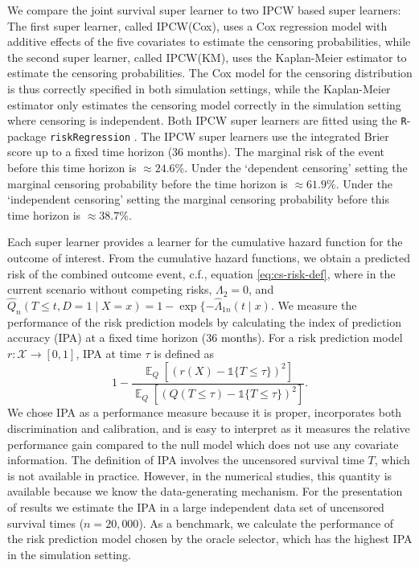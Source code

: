 \documentclass[alpha-refs]{wiley-article}
\DeclareMathOperator{\E}{\mathbb{E}} %
\newcommand{\1}{\mathbb{1}}
\begin{document}
We compare the joint survival super learner to two IPCW based super
learners: The first super learner, called IPCW(Cox), uses a Cox
regression model with additive effects of the five covariates to
estimate the censoring probabilities, while the second super learner,
called IPCW(KM), uses the Kaplan-Meier estimator to estimate the
censoring probabilities. The Cox model for the censoring distribution
is thus correctly specified in both simulation settings, while the
Kaplan-Meier estimator only estimates the censoring model correctly in
the simulation setting where censoring is independent. Both IPCW super
learners are fitted using the \texttt{R}-package
\texttt{riskRegression} \citep{Gerds_Ohlendorff_Ozenne_2023}.
%
%
The IPCW super learners use the integrated Brier score up to a fixed time
horizon (36 months). The marginal risk of the event before this time horizon is
\(\approx 24.6\)\%. Under the `dependent censoring' setting the marginal
censoring probability before the time horizon is \(\approx 61.9\)\%. Under the
`independent censoring' setting the marginal censoring probability before this
time horizon is \( \approx 38.7 \)\%.

Each super learner provides a learner for the cumulative hazard
function for the outcome of interest. From the cumulative hazard
functions, we obtain a predicted risk of the combined outcome event,
c.f., equation \eqref{eq:cs-risk-def}, where in the current scenario
without competing risks, $\Lambda_2 = 0$, and \(\hat Q_n(T \leq t, D =
1 \mid X=x)=1-\exp\{-\hat\Lambda_{1n}(t \mid x)\). We measure the
performance of the risk prediction models by calculating the index of
prediction accuracy (IPA) \citep{kattan2018index} at a fixed time
horizon (36 months). For a risk prediction model \( r \colon
\mathcal{X} \rightarrow [0,1] \), IPA at time \( \tau \) is defined as
\begin{equation*}
  1 - \frac{\E_Q{[(r(X) - \1{\{T \leq \tau\}})^2]}}
  {\E_Q{[( Q{({T \leq \tau})} - \1{\{T \leq \tau\}})^2]}}.
\end{equation*}
We chose IPA as a performance measure because it is proper,
incorporates both discrimination and calibration, and is easy to
interpret as it measures the relative performance gain compared to the
null model which does not use any covariate information. The definition
of IPA involves the uncensored survival time \( T \), which is not
available in practice. However, in the numerical studies, this
quantity is available because we know the data-generating mechanism.
For the presentation of results we estimate the
IPA in a large independent data set of
uncensored survival times (\( n = 20,000 \)).
As a benchmark, we calculate the performance of the risk
prediction model chosen by the oracle selector, which has the highest
IPA in the simulation setting.
\end{document}
